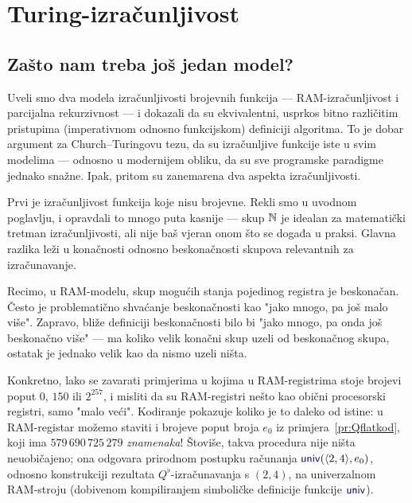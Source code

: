 \chapter{Turing-izračunljivost}\label{ch:Turing}

\section{Zašto nam treba još jedan model?}

Uveli smo dva modela izračunljivosti brojevnih funkcija --- RAM-izračunljivost i parcijalna rekurzivnost --- i dokazali da su ekvivalentni, usprkos bitno različitim pristupima (imperativnom odnosno funkcijskom) definiciji algoritma. To je dobar argument za Church--\!Turingovu tezu, da su izračunljive funkcije iste u svim modelima --- odnosno u modernijem obliku, da su sve programske paradigme jednako snažne. Ipak, pritom su zanemarena dva aspekta izračunljivosti.


Prvi je izračunljivost funkcija koje nisu brojevne. Rekli smo u uvodnom poglavlju, i opravdali to mnogo puta kasnije --- skup ${\mathbb N}$ je idealan za matematički tretman izračunljivosti, ali nije baš vjeran onom što se događa u praksi. Glavna razlika leži u konačnosti odnosno beskonačnosti skupova relevantnih za izračunavanje.

Recimo, u RAM-modelu, skup mogućih stanja pojedinog registra je beskonačan. Često je problematično shvaćanje beskonačnosti kao "jako mnogo, pa još malo više". Zapravo, bliže definiciji beskonačnosti bilo bi "jako mnogo, pa onda još beskonačno više" --- ma koliko velik konačni skup uzeli od beskonačnog skupa, ostatak je jednako velik kao da nismo uzeli ništa.

Konkretno, lako se zavarati primjerima u kojima u RAM-registrima stoje brojevi poput $0$, $150$ ili $2^{257}$, i misliti da su RAM-registri nešto kao obični procesorski registri, samo "malo veći". Kodiranje pokazuje koliko je to daleko od istine: u RAM-registar možemo staviti i brojeve poput broja $e_0$ iz primjera~\ref{pr:Qflatkod}, koji ima $579\,690\,725\,279$ \emph{znamenaka}! Štoviše, takva procedura nije ništa neuobičajeno; ona odgovara prirodnom postupku računanja $\f{univ}(\kr{2,4},e_0)$, odnosno konstrukciji rezultata $Q^\flat$-izračunavanja s $(2,4)$, na univerzalnom RAM-stroju (dobivenom kompiliranjem simboličke definicije funkcije $\f{univ}$).

